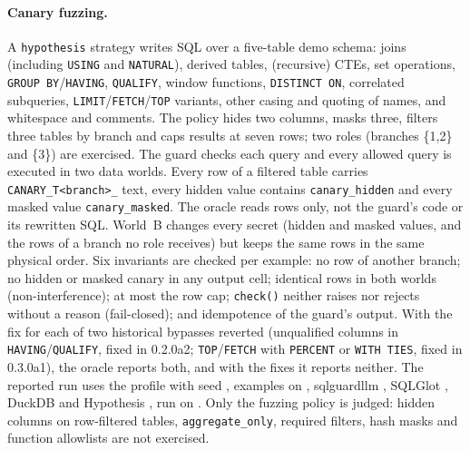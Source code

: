 \documentclass[sigconf,nonacm,natbib=false]{acmart}
\begin{document}
\paragraph{Canary fuzzing.}
A \texttt{hypothesis} strategy writes SQL over a five-table demo schema:
joins (including \texttt{USING} and \texttt{NATURAL}), derived tables,
(recursive) CTEs, set operations, \texttt{GROUP BY}/\texttt{HAVING},
\texttt{QUALIFY}, window functions, \texttt{DISTINCT ON}, correlated
subqueries, \texttt{LIMIT}/\texttt{FETCH}/\texttt{TOP} variants, other casing and
quoting of names, and whitespace and comments. The policy hides two columns,
masks three, filters three tables by branch and caps results at seven rows;
two roles (branches \{1,2\} and \{3\}) are exercised. The guard checks each
query and every allowed query is executed in two data worlds. Every row of a
filtered table carries \texttt{CANARY\_T<branch>\_} text, every hidden value
contains \texttt{canary\_hidden} and every masked value
\texttt{canary\_masked}. The oracle reads rows only, not the guard's code or its
rewritten SQL. World~B changes every secret (hidden and masked values, and
the rows of a branch no role receives) but keeps the same rows in the same
physical order. Six invariants are checked per example: no row of another
branch; no hidden or masked canary in any output cell; identical rows in both
worlds (non-interference); at most the row cap; \texttt{check()} neither raises
nor rejects without a reason (fail-closed); and idempotence of the guard's
output. With the fix for each of two historical bypasses reverted
(unqualified columns in \texttt{HAVING}/\texttt{QUALIFY}, fixed in 0.2.0a2;
\texttt{TOP}/\texttt{FETCH} with \texttt{PERCENT} or \texttt{WITH TIES}, fixed
in 0.3.0a1), the oracle reports both, and with the fixes it reports neither.
The reported run uses the \texttt{\CFProfile{}} profile with seed \CFSeed{},
\CFExamples{} examples on \CFEngines{}, sqlguardllm \CFGuard{}, SQLGlot
\CFSqlglot{}, DuckDB \CFDuckdb{} and Hypothesis \CFHypothesis{}, run on
\CFDate{}. Only the fuzzing policy is judged: hidden columns on row-filtered
tables, \texttt{aggregate\_only}, required filters, hash masks and function
allowlists are not exercised.
\end{document}
